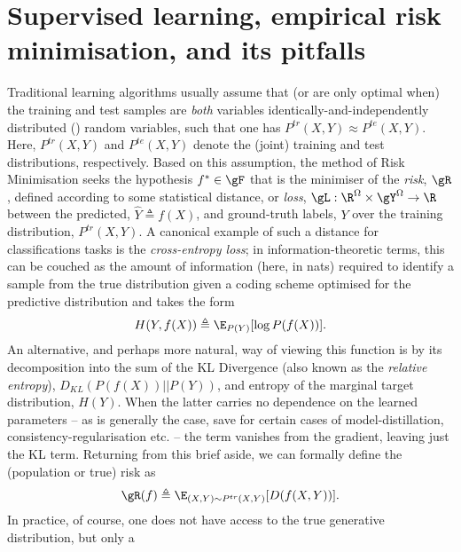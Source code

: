 \section{Supervised learning, empirical risk minimisation, and its pitfalls}\label{sec:iid}
%
Traditional learning algorithms usually assume  that (or are only optimal when) the training and
test samples are \emph{both} variables identically-and-independently distributed (\iid{}) random
variables, such that one has \( P^{tr}(X, Y) \approx P^{te}(X, Y) \). 
%
Here, \( P^{tr}(X, Y) \) and \( P^{te}(X, Y) \) denote the (joint) training and test distributions,
respectively.
%
Based on this assumption, the method of Risk Minimisation seeks the hypothesis \( f^\ast \in \gF \)
that is the minimiser of the \emph{risk}, $\gR$, defined according to some statistical distance, or
\emph{loss}, \( \gL: \R^\Omega \times \gY^\Omega \to \R \) between the predicted, \(\hat{Y}
\triangleq f(X) \), and ground-truth labels, \(Y\) over the training distribution, \(P^{tr}(X,
Y)\). 
%
A canonical example of such a distance for classifications tasks is the \emph{cross-entropy loss};
in information-theoretic terms, this can be couched as the amount of information (here, in nats)
required to identify a sample from the true distribution given a coding scheme optimised for the
predictive distribution and takes the form
%
\begin{equation}
    H(Y, f(X)) \triangleq \E_{P(Y)}[ \log P(f(X)) ].
\end{equation}
%
An alternative, and perhaps more natural, way of viewing this function is by its decomposition into
the sum of the \ac{KL} Divergence (also known as the \emph{relative entropy}),
\(D_{KL}(P(f(X))||P(Y))\), and entropy of the marginal target distribution, \(H(Y)\). 
%
When the latter carries no dependence on the learned parameters -- as is generally the case, save
for certain cases of model-distillation, consistency-regularisation etc. -- the term vanishes from
the gradient, leaving just the \acs{KL} term.
%
Returning from this brief aside, we can formally define the (population or true) risk as
%
\begin{equation}\label{eq:pop_risk} \gR (f) \triangleq \E_{ (X, Y) \sim P^{tr}(X, Y) } [ D ( f(X,
    Y) )].
\end{equation}
%
In practice, of course, one does not have access to the true generative distribution, but only a
